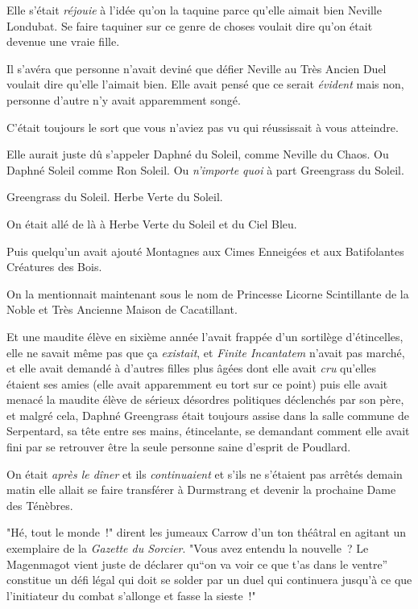 Elle s'était \emph{réjouie} à l'idée qu'on la taquine parce qu'elle aimait bien Neville Londubat. Se faire taquiner sur ce genre de choses voulait dire qu'on était devenue une vraie fille.

Il s'avéra que personne n'avait deviné que défier Neville au Très Ancien Duel voulait dire qu'elle l'aimait bien. Elle avait pensé que ce serait \emph{évident} mais non, personne d'autre n'y avait apparemment songé.

C'était toujours le sort que vous n'aviez pas vu qui réussissait à vous atteindre.

Elle aurait juste dû s'appeler Daphné du Soleil, comme Neville du Chaos. Ou Daphné Soleil comme Ron Soleil. Ou \emph{n'importe quoi} à part Greengrass du Soleil.

Greengrass du Soleil. Herbe Verte du Soleil.

On était allé de là à Herbe Verte du Soleil et du Ciel Bleu.

Puis quelqu'un avait ajouté Montagnes aux Cimes Enneigées et aux Batifolantes Créatures des Bois.

On la mentionnait maintenant sous le nom de Princesse Licorne Scintillante de la Noble et Très Ancienne Maison de Cacatillant.

Et une maudite élève en sixième année l'avait frappée d'un sortilège d'étincelles, elle ne savait même pas que ça \emph{existait}, et \emph{Finite Incantatem} n'avait pas marché, et elle avait demandé à d'autres filles plus âgées dont elle avait \emph{cru} qu'elles étaient ses amies (elle avait apparemment eu tort sur ce point) puis elle avait menacé la maudite élève de sérieux désordres politiques déclenchés par son père, et malgré cela, Daphné Greengrass était toujours assise dans la salle commune de Serpentard, sa tête entre ses mains, étincelante, se demandant comment elle avait fini par se retrouver être la seule personne saine d'esprit de Poudlard.

On était \emph{après le dîner} et ils \emph{continuaient} et s'ils ne s'étaient pas arrêtés demain matin elle allait se faire transférer à Durmstrang et devenir la prochaine Dame des Ténèbres.

"Hé, tout le monde~!" dirent les jumeaux Carrow d'un ton théâtral en agitant un exemplaire de la \emph{Gazette du Sorcier}. "Vous avez entendu la nouvelle~? Le Magenmagot vient juste de déclarer qu“on va voir ce que t'as dans le ventre” constitue un défi légal qui doit se solder par un duel qui continuera jusqu'à ce que l'initiateur du combat s'allonge et fasse la sieste~!"

